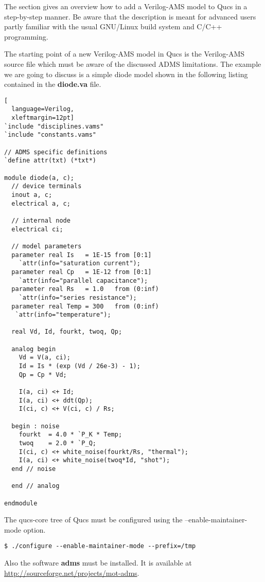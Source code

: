 The section gives an overview how to add a Verilog-AMS model to Qucs
in a step-by-step manner.  Be aware that the description is meant for
advanced users partly familiar with the usual GNU/Linux build system
and C/C++ programming.


The starting point of a new Verilog-AMS model in Qucs is the
Verilog-AMS source file which must be aware of the discussed ADMS
limitations.  The example we are going to discuss is a simple diode
model shown in the following listing contained in the
\textbf{diode.va} file.

\begin{lstlisting}[
  language=Verilog,
  xleftmargin=12pt]
`include "disciplines.vams"
`include "constants.vams"

// ADMS specific definitions 
`define attr(txt) (*txt*) 

module diode(a, c);  
  // device terminals
  inout a, c;
  electrical a, c;

  // internal node
  electrical ci;

  // model parameters
  parameter real Is   = 1E-15 from [0:1]
    `attr(info="saturation current");
  parameter real Cp   = 1E-12 from [0:1]
    `attr(info="parallel capacitance");
  parameter real Rs   = 1.0   from (0:inf)
    `attr(info="series resistance");
  parameter real Temp = 300   from (0:inf)
   `attr(info="temperature");

  real Vd, Id, fourkt, twoq, Qp;

  analog begin
    Vd = V(a, ci);
    Id = Is * (exp (Vd / 26e-3) - 1);
    Qp = Cp * Vd;

    I(a, ci) <+ Id;
    I(a, ci) <+ ddt(Qp);
    I(ci, c) <+ V(ci, c) / Rs;

  begin : noise
    fourkt  = 4.0 * `P_K * Temp;
    twoq    = 2.0 * `P_Q;
    I(ci, c) <+ white_noise(fourkt/Rs, "thermal");
    I(a, ci) <+ white_noise(twoq*Id, "shot");
  end // noise

  end // analog

endmodule
\end{lstlisting}


The qucs-core tree of Qucs must be configured using the
--enable-maintainer-mode option.
\begin{Verbatim}[fontsize=\small]
  $ ./configure --enable-maintainer-mode --prefix=/tmp
\end{Verbatim}
Also the software \textbf{adms} must be installed.  It is available at
\url{http://sourceforge.net/projects/mot-adms}.

